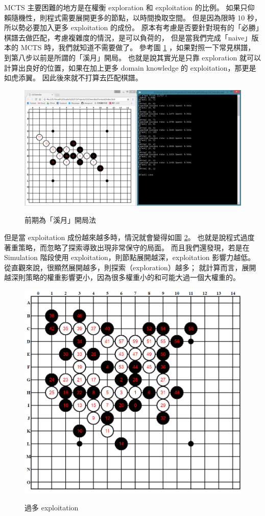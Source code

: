 \documentclass[12pt]{article}
\begin{document}
\begin{CJK}{UTF8}{bsmi}
MCTS 主要困難的地方是在權衡 exploration 和 exploitation 的比例。
如果只仰賴隨機性，則程式需要展開更多的節點，以時間換取空間。
但是因為限時 10 秒，所以勢必要加入更多 exploitation 的成份。
原本有考慮是否要針對現有的「必勝」棋譜去做匹配，考慮複雜度的情況，是可以負荷的，
但是當我們完成「naive」版本的 MCTS 時，我們就知道不需要做了。
參考圖 \ref{intelligent} ，如果對照一下常見棋譜，到第八步以前是所謂的「溪月」開局\cite{Keigetsu}。
也就是說其實光是只靠 exploration 就可以計算出良好的位置，如果在加上更多 domain knowledge 的 exploitation，那更是如虎添翼。
因此後來就不打算去匹配棋譜。

\begin{figure}
  \caption{前期為「溪月」開局法}
  \centering
  \includegraphics[width=1\textwidth]{intelligent}
  \label{intelligent}
\end{figure}

但是當 exploitation 成份越來越多時，情況就會變得如圖 \ref{exploitation}。
也就是說程式過度著重策略，而忽略了探索導致出現非常保守的局面。
而且我們還發現，若是在 Simulation 階段使用 exploitation，則節點展開越深，exploitation 影響力越低。
從直觀來說，很顯然展開越多，則探索（exploration）越多；
就計算而言，展開越深則策略的權重影響更小，因為很多權重小的和可能大過一個大權重的。

\begin{figure}[h]
  \caption{過多 exploitation}
  \centering
  \includegraphics[width=.6\textwidth]{defense}
  \label{exploitation}
\end{figure}


\end{CJK}
\end{document}
